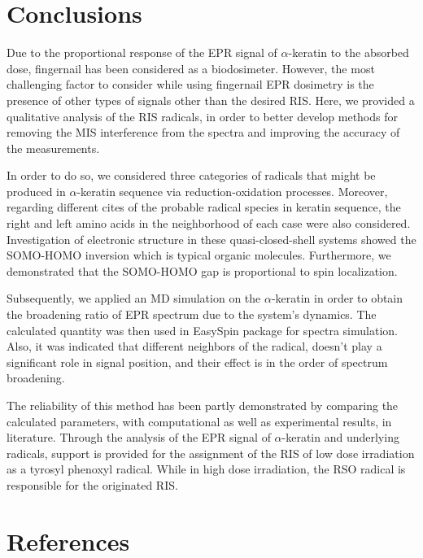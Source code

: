 \documentclass[]{interact}
\theoremstyle{plain}%
\theoremstyle{definition}
\theoremstyle{remark}
\begin{document}
\section{Conclusions}
Due to the proportional response of the EPR signal of \(\alpha\)-keratin to the absorbed dose, fingernail has been considered as a biodosimeter. However, the most challenging factor to consider while using fingernail EPR dosimetry is the presence of other types of signals other than the desired RIS. Here, we provided a qualitative analysis of the RIS radicals, in order to better develop methods for removing the MIS interference from the spectra and improving the accuracy of the measurements.


In order to do so, we considered three categories of radicals that might be produced in  \(\alpha\)-keratin sequence via reduction-oxidation processes. Moreover, regarding different cites of the probable radical species in keratin sequence, the right and left amino acids in the neighborhood of each case were also considered. Investigation of electronic structure in these quasi-closed-shell systems showed the SOMO-HOMO inversion which is typical organic molecules. Furthermore, we demonstrated that the SOMO-HOMO gap is proportional to spin localization.


Subsequently, we applied an MD simulation on the  \(\alpha\)-keratin in order to obtain the broadening ratio of  EPR spectrum due to the system's dynamics. The calculated quantity was then used in EasySpin package for spectra simulation. Also, it was indicated that different neighbors of the radical, doesn't play a significant role in signal position, and their effect is in the order of spectrum broadening.


The reliability of this method has been partly demonstrated by comparing the calculated parameters, with computational as well as experimental results, in literature. Through the analysis of the EPR signal of \(\alpha\)-keratin and underlying radicals, support is provided for the assignment of the RIS of low dose irradiation as a tyrosyl phenoxyl radical. While in high dose irradiation, the RSO radical is responsible for the originated RIS.










\section{References}
\end{document}
